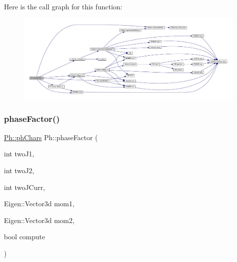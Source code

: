 Here is the call graph for this function\+:
\nopagebreak
\begin{figure}[H]
\begin{center}
\leavevmode
\includegraphics[width=350pt]{d6/d3c/namespacePh_a51140cf285f02c028134a1e40807b54b_cgraph}
\end{center}
\end{figure}
\mbox{\label{namespacePh_ad2fd8f885053b0833441c8388a9218b8}} 
\subsubsection{\texorpdfstring{phaseFactor()}{phaseFactor()}\hspace{0.1cm}{\footnotesize\ttfamily [2/2]}}
{\footnotesize\ttfamily \mbox{\hyperlink{structPh_1_1phChars}{Ph\+::ph\+Chars}} Ph\+::phase\+Factor (\begin{DoxyParamCaption}\item[{int}]{two\+J1,  }\item[{int}]{two\+J2,  }\item[{int}]{two\+J\+Curr,  }\item[{Eigen\+::\+Vector3d}]{mom1,  }\item[{Eigen\+::\+Vector3d}]{mom2,  }\item[{bool}]{compute }\end{DoxyParamCaption})}

